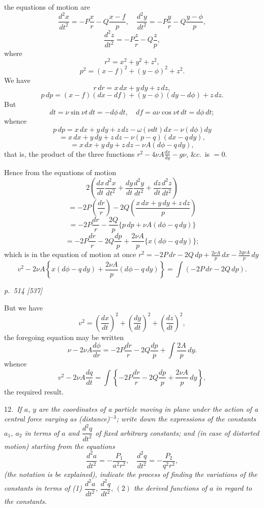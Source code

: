 \documentclass[11pt,a4paper]{book}
\begin{document}
\noindent
the equations of motion are
\[
\frac{d^2x}{dt^2} = -P\frac{x}{r} - Q\frac{x - f}{p}, \quad \frac{d^2y}{dt^2} = -P\frac{y}{r} - Q\frac{y - \phi}{p},
\]
\[
\frac{d^2z}{dt^2} = -P\frac{z}{r} - Q\frac{z}{p},
\]
where
\[
r^2 = x^2 + y^2 + z^2,
\]
\[
p^2 = (x - f)^2 + (y - \phi)^2 + z^2.
\]
We have
\[
r\,dr = x\,dx + y\,dy + z\,dz,
\]
\[
p\,dp = (x - f)(dx - df) + (y - \phi)(dy - d\phi) + z\,dz.
\]
But
\[
dt = \nu\sin\nu t\,dt = -d\phi\,dt, \quad df = a\nu\cos\nu t\,dt = d\phi\,dt;
\]
whence
\[
p\,dp = x\,dx + y\,dy + z\,dz - \omega(\nu d t)dx - \nu(d\phi)d y
\]
\[
= x\,dx + y\,dy + z\,dz - \nu(p - q)(dx - q\,dy),
\]
\[
= x\,dx + y\,dy + z\,dz - \nu A(d\phi - q\,dy),
\]
that is, the product of the three functions $r^2 - 4\nu A\frac{dx}{dy} - g\nu$, $\&c.$\, is $= 0$.

Hence from the equations of motion
\[
2\left(\frac{dx}{dt}\frac{d^2x}{dt^2} + \frac{dy}{dt}\frac{d^2y}{dt^2} + \frac{dz}{dt}\frac{d^2z}{dt^2}\right)
\]
\[
= -2P\left(\frac{dr}{r}\right) - 2Q\left(\frac{x\,dx + y\,dy + z\,dz}{p}\right)
\]
\[
= -2P\frac{dr}{r} - \frac{2Q}{p}\{p\,dp + \nu A(d\phi - q\,dy)\}
\]
\[
= -2P\frac{dr}{r} - 2Q\frac{dp}{p} + \frac{2\nu A}{p}\{x(d\phi - q\,dy)\};
\]
which is in the equation of motion at once $r^2 = -2P\,dr - 2Q\,dp + \frac{2\nu A}{p}\,dx - \frac{2 q \nu A}{p}\,dy$
\[
v^2 - 2\nu A\left\{x(d\phi - q\,dy) + \frac{2\nu A}{p}(d\phi - q\,dy)\right\} = \int(-2P\,dr - 2Q\,dp).
\]

\clearpage

\bigskip
\textit{p.~514 [537]}
\smallskip

\noindent
But we have
\[
v^2 = \left(\frac{dx}{dt}\right)^2 + \left(\frac{dy}{dt}\right)^2 + \left(\frac{dz}{dt}\right)^2,
\]
the foregoing equation may be written
\[
\nu - 2\nu A\frac{d\phi}{dr} = -2P\frac{dr}{r} - 2Q\frac{dp}{p} + \int\frac{2 A}{p}\,dy.
\]
whence
\[
v^2 - 2\nu A\frac{dq}{dt} = \int\left\{-2P\frac{dr}{r} - 2Q\frac{dp}{p} + \frac{2\nu A}{p}\,dy\right\},
\]
the required result.

\smallskip
\noindent\textsc{12.}\, \textit{If $a$, $y$ are the coordinates of a particle moving in plane under the action
of a central force varying as (distance)$^{-3}$; write down the expressions of the constants
$a_1$, $a_2$ in terms of $a$ and $\dfrac{d^2 q}{dt^2}$ of fixed arbitrary constants; and (in case of distorted
motion) starting from the equations
\[
\frac{d^2 a}{dt^2} = -\frac{P_1}{a^2 r^2}, \quad \frac{d^2 q}{dt^2} = -\frac{P_2}{q^2 r^2},
\]
(the notation is be explained), indicate the process of finding the variations of the
constants in terms of (1) $\dfrac{d^2 a}{dt^2},\, \dfrac{d^2 q}{dt^2},\, (2)$ the derived functions of $a$ in regard to the constants.}
\end{document}
